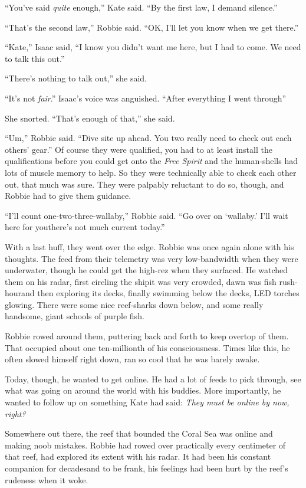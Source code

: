 “You’ve said \emph{quite} enough,” Kate said. “By the first law, I
demand silence.”

“That’s the second law,” Robbie said. “OK, I’ll let you know when
we get there.”

“Kate,” Isaac said, “I know you didn’t want me here, but I had to
come. We need to talk this out.”

“There’s nothing to talk out,” she said.

“It’s not \emph{fair}.” Isaac’s voice was anguished. “After
everything I went through\dash{}”

She snorted. “That’s enough of that,” she said.

“Um,” Robbie said. “Dive site up ahead. You two really need to
check out each others’ gear.” Of course they were qualified, you
had to at least install the qualifications before you could get
onto the \emph{Free Spirit} and the human-shells had lots of muscle
memory to help. So they were technically able to check each other
out, that much was sure. They were palpably reluctant to do so,
though, and Robbie had to give them guidance.

“I’ll count one-two-three-wallaby,” Robbie said. “Go over on
‘wallaby.’ I’ll wait here for you\dash{}there’s not much current today.”

With a last huff, they went over the edge. Robbie was once again
alone with his thoughts. The feed from their telemetry was very
low-bandwidth when they were underwater, though he could get the
high-rez when they surfaced. He watched them on his radar, first
circling the ship\dash{}it was very crowded, dawn was fish rush-hour\dash{}and
then exploring its decks, finally swimming below the decks, LED
torches glowing. There were some nice reef-sharks down below, and
some really handsome, giant schools of purple fish.

Robbie rowed around them, puttering back and forth to keep overtop
of them. That occupied about one ten-millionth of his
consciousness. Times like this, he often slowed himself right down,
ran so cool that he was barely awake.

Today, though, he wanted to get online. He had a lot of feeds to
pick through, see what was going on around the world with his
buddies. More importantly, he wanted to follow up on something Kate
had said: \emph{They must be online by now, right?}

Somewhere out there, the reef that bounded the Coral Sea was online
and making noob mistakes. Robbie had rowed over practically every
centimeter of that reef, had explored its extent with his radar. It
had been his constant companion for decades\dash{}and to be frank, his
feelings had been hurt by the reef’s rudeness when it woke.

